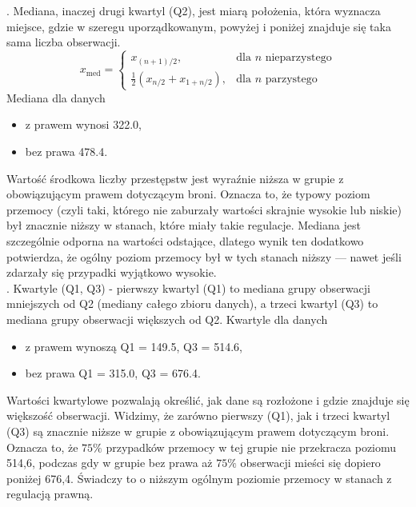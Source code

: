 \documentclass[a4paper,12pt]{article}
\begin{document}
	. Mediana, inaczej drugi kwartyl (Q2), jest miarą położenia, która wyznacza miejsce, gdzie w szeregu uporządkowanym, powyżej i poniżej znajduje się taka sama liczba obserwacji. 
	\begin{equation}
		x_{\text{med}} = \left\{ 
		\begin{array}{ll}
			x_{(n+1)/2}, & \text{dla $n$ nieparzystego} \\
			\frac{1}{2}(x_{n/2} + x_{1 + n/2}), & \text{dla $n$ parzystego}
		\end{array}
		\right.
	\end{equation}
	Mediana dla danych
	\begin{itemize}[itemsep=3pt,parsep=0pt]
		\item z prawem wynosi 322.0,
		\item bez prawa 478.4.
	\end{itemize}
	Wartość środkowa liczby przestępstw jest wyraźnie niższa w grupie z obowiązującym prawem dotyczącym broni. Oznacza to, że typowy poziom przemocy (czyli taki, którego nie zaburzały wartości skrajnie wysokie lub niskie) był znacznie niższy w stanach, które miały takie regulacje. Mediana jest szczególnie odporna na wartości odstające, dlatego wynik ten dodatkowo potwierdza, że ogólny poziom przemocy był w tych stanach niższy --- nawet jeśli zdarzały się przypadki wyjątkowo wysokie. \\
	
	. Kwartyle (Q1, Q3) - pierwszy kwartyl (Q1) to mediana grupy obserwacji mniejszych od Q2 (mediany całego zbioru danych), a trzeci kwartyl (Q3) to mediana grupy obserwacji większych od Q2.
	Kwartyle dla danych
	\begin{itemize}[itemsep=5pt,parsep=0pt]
		\item z prawem wynoszą Q1 = 149.5, Q3 = 514.6,
		\item bez prawa Q1 = 315.0, Q3 = 676.4.
	\end{itemize}
	Wartości kwartylowe pozwalają określić, jak dane są rozłożone i gdzie znajduje się większość obserwacji. Widzimy, że zarówno pierwszy (Q1), jak i trzeci kwartyl (Q3) są znacznie niższe w grupie z obowiązującym prawem dotyczącym broni. Oznacza to, że $75\%$ przypadków przemocy w tej grupie nie przekracza poziomu 514,6, podczas gdy w grupie bez prawa aż $75\%$ obserwacji mieści się dopiero poniżej 676,4. Świadczy to o niższym ogólnym poziomie przemocy w stanach z regulacją prawną. \\
	
\end{document}
